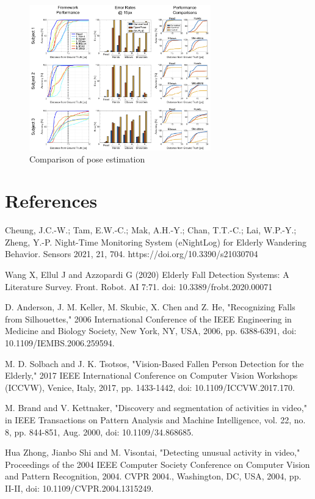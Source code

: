 \documentclass[12pt]{article}
\begin{document}
\begin{figure}[H]
\centering
\includegraphics[width=0.7\textwidth]{Paper10.pic.jpg}
\caption{Comparison of pose estimation} 
\end{figure}

\newpage
\section{References}
Cheung, J.C.-W.; Tam, E.W.-C.; Mak, A.H.-Y.; Chan, T.T.-C.; Lai, W.P.-Y.; Zheng, Y.-P. Night-Time Monitoring System (eNightLog) for Elderly Wandering Behavior. Sensors 2021, 21, 704. https://doi.org/10.3390/s21030704

\noindent Wang X, Ellul J and Azzopardi G (2020) Elderly Fall Detection Systems: A Literature Survey. Front. Robot. AI 7:71. doi: 10.3389/frobt.2020.00071

\noindent D. Anderson, J. M. Keller, M. Skubic, X. Chen and Z. He, "Recognizing Falls from Silhouettes," 2006 International Conference of the IEEE Engineering in Medicine and Biology Society, New York, NY, USA, 2006, pp. 6388-6391, doi: 10.1109/IEMBS.2006.259594.

\noindent M. D. Solbach and J. K. Tsotsos, "Vision-Based Fallen Person Detection for the Elderly," 2017 IEEE International Conference on Computer Vision Workshops (ICCVW), Venice, Italy, 2017, pp. 1433-1442, doi: 10.1109/ICCVW.2017.170.

\noindent M. Brand and V. Kettnaker, "Discovery and segmentation of activities in video," in IEEE Transactions on Pattern Analysis and Machine Intelligence, vol. 22, no. 8, pp. 844-851, Aug. 2000, doi: 10.1109/34.868685.

\noindent Hua Zhong, Jianbo Shi and M. Visontai, "Detecting unusual activity in video," Proceedings of the 2004 IEEE Computer Society Conference on Computer Vision and Pattern Recognition, 2004. CVPR 2004., Washington, DC, USA, 2004, pp. II-II, doi: 10.1109/CVPR.2004.1315249.
\end{document}

